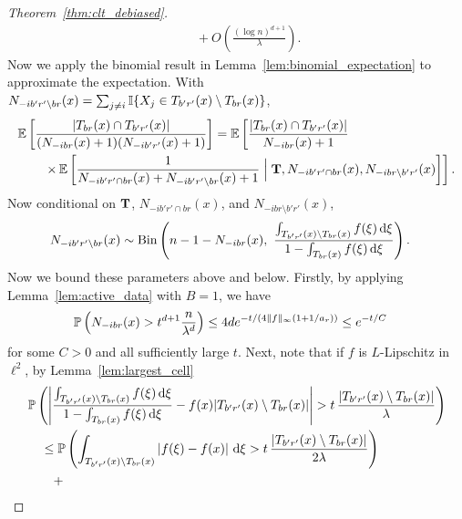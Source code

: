\begin{proof}[Theorem~\ref{thm:clt_debiased}]
\begin{align*}
    &\quad+
    O \left(
      \frac{(\log n)^{d+1}}{\lambda}
    \right).
  \end{align*}
  Now we apply the binomial result in
  Lemma~\ref{lem:binomial_expectation}
  to approximate the expectation. With
  $N_{-i b' r' \setminus b r}(x) =
  \sum_{j \neq i} \I\{X_j \in T_{b' r'}(x) \setminus T_{b r}(x)\}$,
  \begin{align*}
    &\E \left[
      \frac{|T_{b r}(x) \cap T_{b' r'}(x)|}
      {(N_{-i b r}(x)+1) (N_{-i b' r'}(x)+1)}
    \right]
    = \E \left[
      \frac{|T_{b r}(x) \cap T_{b' r'}(x)|}
      {N_{-i b r}(x)+1}
      \right. \\
      &\qquad\left.
      \times \,
      \E \left[
        \frac{1}
        {N_{-i b' r' \cap b r}(x)+N_{-i b' r' \setminus b r}(x)+1}
        \Bigm| \bT, N_{-i b' r' \cap b r}(x), N_{-i b r \setminus b' r'}(x)
      \right]
    \right].
  \end{align*}
  Now conditional on
  $\bT$, $N_{-i b' r' \cap b r}(x)$, and $N_{-i b r \setminus b' r'}(x)$,
  \begin{align*}
    N_{-i b' r' \setminus b r}(x)
    &\sim \Bin\left(
      n - 1 - N_{-i b r}(x), \
      \frac{\int_{T_{b' r'}(x) \setminus T_{b r}(x)} f(\xi) \diff \xi}
      {1 - \int_{T_{b r}(x)}
      f(\xi) \diff \xi}
    \right).
  \end{align*}
  Now we bound these parameters above and below.
  Firstly, by applying Lemma~\ref{lem:active_data} with $B=1$,
  we have
  \begin{align*}
    \P \left( N_{-i b r}(x) >
      t^{d+1}
      \frac{n}{\lambda^d}
    \right)
    &\leq
    4 d e^{- t / (4 \|f\|_\infty(1 + 1/a_r))}
    \leq
    e^{- t / C}
  \end{align*}
  for some $C > 0$ and all sufficiently large $t$.
  Next, note that if $f$ is $L$-Lipschitz in $\ell^2$,
  by Lemma~\ref{lem:largest_cell}
  \begin{align*}
    &\P \left(
      \left|
      \frac{\int_{T_{b' r'}(x) \setminus T_{b r}(x)} f(\xi) \diff \xi}
      {1 - \int_{T_{b r}(x)} f(\xi)
      \diff \xi}
      - f(x) |T_{b' r'}(x) \setminus T_{b r}(x)|
      \right|
      > t \, \frac{|T_{b' r'}(x) \setminus T_{b r}(x)|}{\lambda}
    \right) \\
    &\quad\leq
    \P \left(
      \int_{T_{b' r'}(x) \setminus T_{b r}(x)}
      \left| f(\xi) - f(x) \right|
      \diff \xi
      > t \, \frac{|T_{b' r'}(x) \setminus T_{b r}(x)|}{2 \lambda}
    \right) \\
    &\qquad+

\end{align*}
\end{proof}
